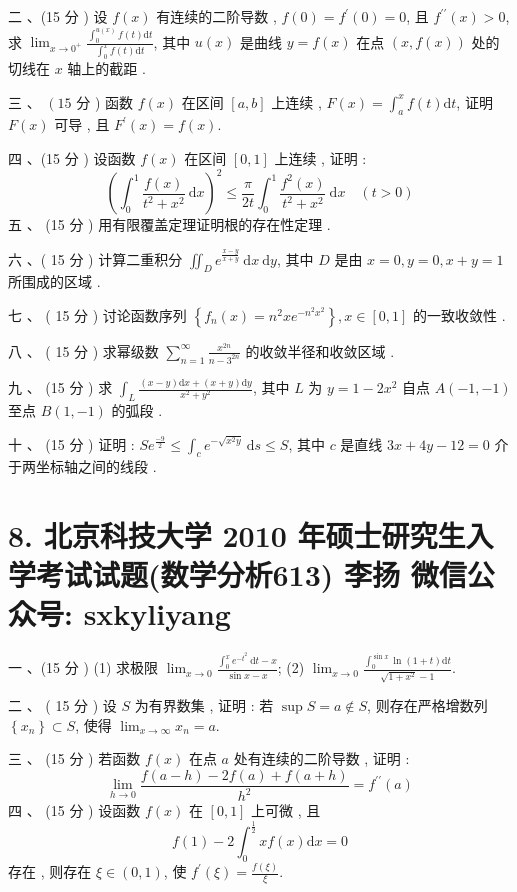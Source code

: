 \documentclass[10pt]{article}
\begin{document}
{ 二 、(15  分 )  设  $f(x)$  有连续的二阶导数 , $f(0)=f^{\prime}(0)=0$,  且  $f^{\prime \prime}(x)>0$,  求  $\lim _{x \rightarrow 0^{+}} \frac{\int_{0}^{u(x)} f(t) \mathrm{d} t}{\int_{0}^{x} f(t) \mathrm{d} t}$,  其中  $u(x)$  是曲线  $y=f(x)$  在点  $(x, f(x))$  处的切线在  $x$  轴上的截距 .

 三 、 $\left(15\right.$  分 )  函数  $f(x)$  在区间  $[a, b]$  上连续 , $F(x)=\int_{a}^{x} f(t) \mathrm{d} t$,  证明  $F(x)$  可导 ,  且  $F^{\prime}(x)=f(x)$.

 四 、(15  分 )  设函数  $f(x)$  在区间  $[0,1]$  上连续 ,  证明 :
$$
\left(\int_{0}^{1} \frac{f(x)}{t^{2}+x^{2}} \mathrm{~d} x\right)^{2} \leq \frac{\pi}{2 t} \int_{0}^{1} \frac{f^{2}(x)}{t^{2}+x^{2}} \mathrm{~d} x \quad(t>0)
$$
 五 、 (15  分 )  用有限覆盖定理证明根的存在性定理 .

 六 、( 15  分 )  计算二重积分  $\iint_{D} e^{\frac{x-y}{x+y}} \mathrm{~d} x \mathrm{~d} y$,  其中  $D$  是由  $x=0, y=0, x+y=1$  所围成的区域 .

 七 、 ( 15  分 )  讨论函数序列  $\left\{f_{n}(x)=n^{2} x e^{-n^{2} x^{2}}\right\}, x \in[0,1]$  的一致收敛性 .

 八 、 ( 15  分 )  求幂级数  $\sum_{n=1}^{\infty} \frac{x^{2 n}}{n-3^{2 n}}$  的收敛半径和收敛区域 .

 九 、 (15  分 )  求  $\int_{L} \frac{(x-y) \mathrm{d} x+(x+y) \mathrm{d} y}{x^{2}+y^{2}}$,  其中  $L$  为  $y=1-2 x^{2}$  自点  $A(-1,-1)$  至点  $B(1,-1)$  的弧段 .

 十 、 (15  分 )  证明 : $S e^{\frac{-9}{2}} \leq \int_{c} e^{-\sqrt{x^{2} y}} \mathrm{~d} s \leq S$,  其中  $c$  是直线  $3 x+4 y-12=0$  介于两坐标轴之间的线段 .

\section{8. 北京科技大学 2010 年硕士研究生入学考试试题(数学分析613) 
 李扬 
 微信公众号: sxkyliyang}
 一 、(15  分 ) (1)  求极限  $\lim _{x \rightarrow 0} \frac{\int_{0}^{x} e^{-t^{2}} \mathrm{~d} t-x}{\sin x-x}$; (2) $\lim _{x \rightarrow 0} \frac{\int_{0}^{\sin x} \ln (1+t) \mathrm{d} t}{\sqrt{1+x^{2}}-1}$.

 二 、 ( 15  分 )  设  $S$  为有界数集 ,  证明 :  若  $\sup S=a \notin S$,  则存在严格增数列  $\left\{x_{n}\right\} \subset S$,  使得  $\lim _{x \rightarrow \infty} x_{n}=a$.

 三 、 (15  分 )  若函数  $f(x)$  在点  $a$  处有连续的二阶导数 ,  证明 :
$$
\lim _{h \rightarrow 0} \frac{f(a-h)-2 f(a)+f(a+h)}{h^{2}}=f^{\prime \prime}(a)
$$
 四 、 (15  分 )  设函数  $f(x)$  在  $[0,1]$  上可微 ,  且 
$$
f(1)-2 \int_{0}^{\frac{1}{2}} x f(x) \mathrm{d} x=0
$$
 存在 ,  则存在  $\xi \in(0,1)$,  使  $f^{\prime}(\xi)=\frac{f(\xi)}{\xi}$.

}
\end{document}
